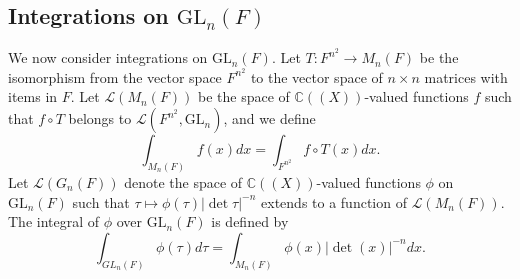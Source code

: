 \documentclass{amsart}
\theoremstyle{definition}
\theoremstyle{remark}
\numberwithin{equation}{section}
\def  \GL        {\mathrm{GL}}
\def  \cl       {\mathcal{L}}
\def  \bc       {\mathbb{C}}
\begin{document}
\vspace{1em}
\subsection{Integrations on $\GL_n(F)$}

We now consider  integrations on $\GL_n(F)$.  Let $T:    F^{n^2}\to M_n(F)$ be the isomorphism from the vector space $F^{n^2}$   to the vector space of $n \times n$ matrices with items in $F$.  Let $\cl(M_n(F))$ be the space of $\bc((X))$-valued functions $f$ such that $f \circ T$ belongs to $\cl(F^{n^2}, \GL_n)$, and we define
$$
\int_{M_n(F)} f(x)dx = \int_{F^{n^2}}  f \circ T(x) dx.
$$
Let $\cl(G_n(F))$ denote the space of $\bc((X))$-valued functions $\phi$ on $\GL_n(F)$  such that  $\tau \mapsto  \phi(\tau)|\det \tau|^{-n} $  extends to a function of $\cl(M_n(F))$. The integral of $\phi$ over $\GL_n (F)$   is defined by
$$
\int_{GL_n(F)} \phi(\tau) d\tau  = \int_{M_n(F)} \phi(x)  |\det(x)|^{-n} dx.
$$
 
\end{document}
